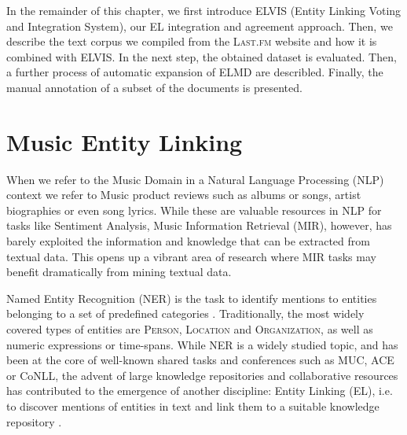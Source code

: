 
In the remainder of this chapter, we first introduce \textsc{ELVIS} (Entity Linking Voting and Integration System), our EL integration and agreement approach. Then, we describe the text corpus we compiled from the \textsc{Last.fm} website and how it is combined with ELVIS. In the next step, the obtained dataset is evaluated. Then, a further process of automatic expansion of \textsc{ELMD} are describled. Finally, the manual annotation of a subset of the documents is presented. %


\section{Music Entity Linking}

When we refer to the Music Domain in a Natural Language Processing (NLP) context we refer to Music product reviews such as albums or songs, artist biographies or even song lyrics. While these are valuable resources in NLP for tasks like Sentiment Analysis, Music Information Retrieval (MIR), however, has barely exploited the information and knowledge that can be extracted from textual data. This opens up a vibrant area of research where MIR tasks may benefit dramatically from mining textual data. 

Named Entity Recognition (NER) is the task to identify mentions to entities belonging to a set of predefined categories \cite{ZhouandJian2002}. Traditionally, the most widely covered types of entities are \textsc{Person}, \textsc{Location} and \textsc{Organization}, as well as numeric expressions or time-spans. While NER is a widely studied topic, and has been at the core of well-known shared tasks and conferences \cite{Nadeau2007} such as MUC, ACE or CoNLL, the advent of large knowledge repositories and collaborative resources has contributed to the emergence of another discipline: Entity Linking (EL), i.e. to discover mentions of entities in text and link them to a suitable knowledge repository \cite{Moroetal2014}.


